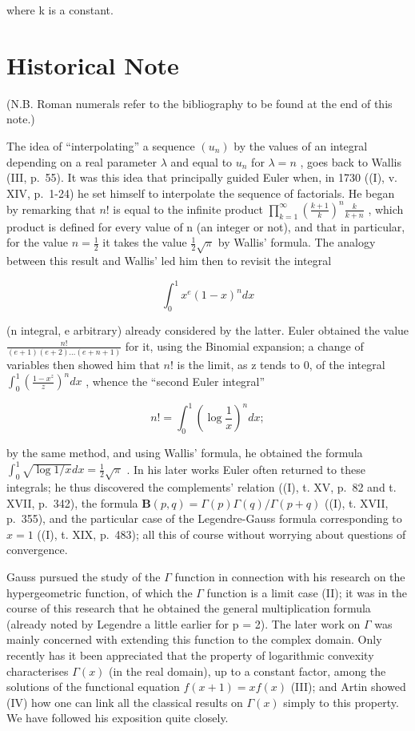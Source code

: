 where k is a constant.

\section*{Historical Note}
{}

(N.B. Roman numerals refer to the bibliography to be found at the end of this note.)

The idea of ``interpolating'' a sequence \((u_{n})\) by the values of an integral depending on a real parameter \(\lambda\) and equal to \(u_{n}\) for \(\lambda = n\) , goes back to Wallis (III, p.~55). It was this idea that principally guided Euler when, in 1730 ((I), v. XIV, p.~1-24) he set himself to interpolate the sequence of factorials. He began by remarking that \(n!\) is equal to the infinite product \(\prod_{k=1}^{\infty}\left(\frac{k+1}{k}\right)^{n}\frac{k}{k+n}\) , which product is defined for every value of n (an integer or not), and that in particular, for the value \(n = \frac{1}{2}\) it takes the value \(\frac{1}{2}\sqrt{\pi}\) by Wallis' formula. The analogy between this result and Wallis' led him then to revisit the integral

\[
\int_ {0} ^ {1} x ^ {e} (1 - x) ^ {n} d x
\]

(n integral, e arbitrary) already considered by the latter. Euler obtained the value \(\frac{n!}{(e+1)(e+2)\ldots(e+n+1)}\) for it, using the Binomial expansion; a change of variables then showed him that \(n!\) is the limit, as z tends to 0, of the integral \(\int_{0}^{1}\left(\frac{1-x^{z}}{z}\right)^{n}dx\) , whence the ``second Euler integral''

\[
n! = \int_ {0} ^ {1} \left(\log \frac {1}{x}\right) ^ {n} d x;
\]

by the same method, and using Wallis' formula, he obtained the formula \(\int_0^1\sqrt{\log 1 / x} dx = \frac{1}{2}\sqrt{\pi}\) . In his later works Euler often returned to these integrals; he thus discovered the complements' relation ((I), t. XV, p.~82 and t. XVII, p.~342), the formula \(\mathbf{B}(p,q) = \Gamma (p)\Gamma (q) / \Gamma (p + q)\) ((I), t. XVII, p.~355), and the particular case of the Legendre-Gauss formula corresponding to \(x = 1\) ((I), t. XIX, p.~483); all this of course without worrying about questions of convergence.

Gauss pursued the study of the \(\Gamma\) function in connection with his research on the hypergeometric function, of which the \(\Gamma\) function is a limit case (II); it was in the course of this research that he obtained the general multiplication formula (already noted by Legendre a little earlier for p = 2). The later work on \(\Gamma\) was mainly concerned with extending this function to the complex domain. Only recently has it been appreciated that the property of logarithmic convexity characterises \(\Gamma(x)\) (in the real domain), up to a constant factor, among the solutions of the functional equation \(f(x + 1) = x f(x)\) (III); and Artin showed (IV) how one can link all the classical results on \(\Gamma(x)\) simply to this property. We have followed his exposition quite closely.

